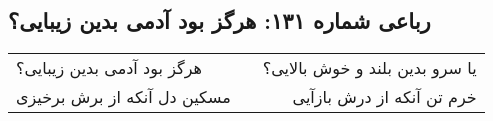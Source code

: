 \begin{center}
\section*{رباعی شماره ۱۳۱: هرگز بود آدمی بدین زیبایی؟}
\label{sec:131}
\begin{longtable}{l p{0.5cm} r}
هرگز بود آدمی بدین زیبایی؟
&&
یا سرو بدین بلند و خوش بالایی؟
\\
مسکین دل آنکه از برش برخیزی
&&
خرم تن آنکه از درش بازآیی
\\
\end{longtable}
\end{center}
